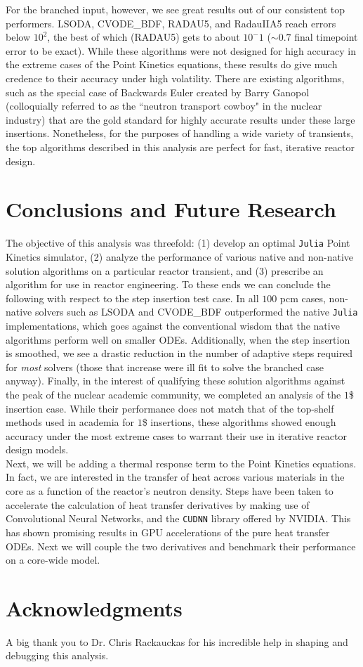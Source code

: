 \documentclass[review,onefignum,onetabnum]{siamart171218}
\begin{document}
For the branched input, however, we see great results out of our consistent top
performers. LSODA, CVODE\_BDF, RADAU5, and RadauIIA5 reach errors below $10^2$,
the best of which (RADAU5) gets to about $10^-1$ ($\sim 0.7$ final timepoint
error to be exact). While these algorithms were not designed for high accuracy in the
extreme cases of the Point Kinetics equations, these results do give much credence
to their accuracy under high volatility. There are existing algorithms, such as the
special case of Backwards Euler created by Barry Ganopol (colloquially referred to as
the ``neutron transport cowboy" in the nuclear industry)
that are the gold standard for highly accurate results under these
large insertions. \cite{Ganopol_accurate} Nonetheless, for the purposes of handling
a wide variety of transients, the top algorithms described in this analysis are
perfect for fast, iterative reactor design.

\section{Conclusions and Future Research}
The objective of this analysis was threefold: (1) develop an optimal \texttt{Julia}
Point Kinetics simulator, (2) analyze the performance of various native and non-native
solution algorithms on a particular reactor transient, and (3) prescribe an algorithm
for use in reactor engineering. To these ends we can conclude the following with respect
to the step insertion test case. In all $100$ pcm cases, non-native solvers such as LSODA and
CVODE\_BDF outperformed the native \texttt{Julia} implementations, which goes
against the conventional wisdom that the native algorithms perform well on smaller
ODEs. Additionally, when the step insertion is smoothed, we see a drastic reduction in the number of adaptive
steps required for \emph{most} solvers (those that increase were ill fit to solve the
branched case anyway). Finally, in the interest of qualifying these solution algorithms
against the peak of the nuclear academic community, we completed an analysis of the $1$\$
insertion case. While their performance does not match that of the top-shelf methods
used in academia for $1$\$ insertions, these algorithms showed enough accuracy under the
most extreme cases to warrant their use in iterative reactor design models. \\

Next, we will be adding a thermal response term to the Point Kinetics equations.
In fact, we are interested in the transfer of heat across various materials in the
core as a function of the reactor's neutron density. Steps have been taken to accelerate
the calculation of heat transfer derivatives by making use of Convolutional Neural Networks,
and the \texttt{CUDNN} library offered by NVIDIA. This has shown promising results in
GPU accelerations of the pure heat transfer ODEs. Next we will couple the two derivatives
and benchmark their performance on a core-wide model.

\section*{Acknowledgments}
A big thank you to Dr. Chris Rackauckas for his incredible help in shaping and debugging
this analysis.



\end{document}
